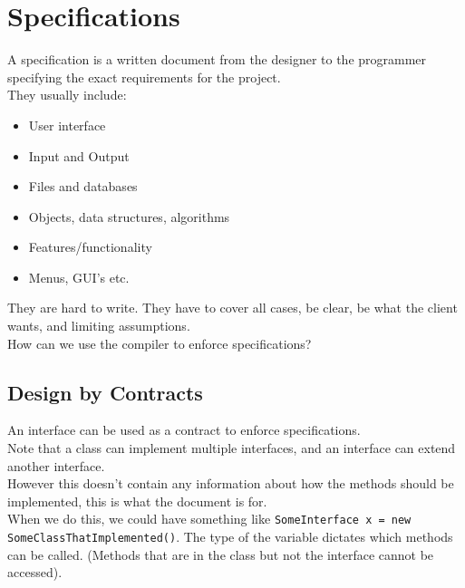 \documentclass[12pt]{article}
\theoremstyle{definition}
\begin{document}
\section{Specifications}
A specification is a written document from the designer to the programmer specifying the exact requirements for the project.
\\ \linebreak
They usually include:
\begin{itemize}
	\item User interface
	\item Input and Output
	\item Files and databases
	\item Objects, data structures, algorithms
	\item Features/functionality
	\item Menus, GUI's etc.
\end{itemize}
They are hard to write. They have to cover all cases, be clear, be what the client wants, and limiting assumptions.
\\ \linebreak
How can we use the compiler to enforce specifications?
\\ \linebreak
\subsection{Design by Contracts}
An interface can be used as a contract to enforce specifications.
\\ \linebreak 
Note that a class can implement multiple interfaces, and an interface can extend another interface.
\\ \linebreak
However this doesn't contain any information about how the methods should be implemented, this is what the document is for.
\\ \linebreak
When we do this, we could have something like \texttt{SomeInterface x = new SomeClassThatImplemented()}. The type of the variable dictates which methods can be called. (Methods that are in the class but not the interface cannot be accessed).
\end{document}
